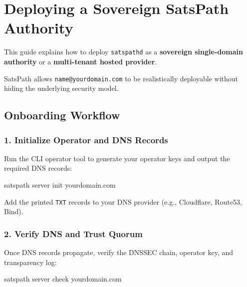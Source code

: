 \documentclass[
]{article}
\author{}
\date{}
\newenvironment{Shaded}{}{}
\newcommand{\ExtensionTok}[1]{#1}
\newcommand{\NormalTok}[1]{#1}
\begin{document}
\hypertarget{deploying-a-sovereign-satspath-authority}{%
\section{Deploying a Sovereign SatsPath
Authority}\label{deploying-a-sovereign-satspath-authority}}

This guide explains how to deploy \texttt{satspathd} as a
\textbf{sovereign single-domain authority} or a \textbf{multi-tenant
hosted provider}.

SatsPath allows \texttt{name@yourdomain.com} to be realistically
deployable without hiding the underlying security model.

\hypertarget{onboarding-workflow}{%
\subsection{Onboarding Workflow}\label{onboarding-workflow}}

\hypertarget{initialize-operator-and-dns-records}{%
\subsubsection{1. Initialize Operator and DNS
Records}\label{initialize-operator-and-dns-records}}

Run the CLI operator tool to generate your operator keys and output the
required DNS records:

\begin{Shaded}
\begin{Highlighting}[]
\ExtensionTok{satspath}\NormalTok{ server init yourdomain.com}
\end{Highlighting}
\end{Shaded}

Add the printed \texttt{TXT} records to your DNS provider (e.g.,
Cloudflare, Route53, Bind).

\hypertarget{verify-dns-and-trust-quorum}{%
\subsubsection{2. Verify DNS and Trust
Quorum}\label{verify-dns-and-trust-quorum}}

Once DNS records propagate, verify the DNSSEC chain, operator key, and
transparency log:

\begin{Shaded}
\begin{Highlighting}[]
\ExtensionTok{satspath}\NormalTok{ server check yourdomain.com}
\end{Highlighting}
\end{Shaded}
\end{document}

